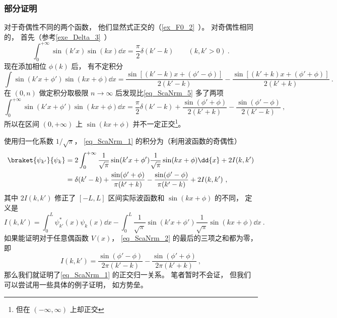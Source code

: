 \subsubsection{部分证明}
对于奇偶性不同的两个函数， 他们显然式正交的（\autoref{ex_F0_2}~）。 对奇偶性相同的， 首先（参考\autoref{exe_Delta_3}~）
\begin{equation}\label{eq_ScaNrm_5}
\int_{0}^{+\infty} \sin(k'x)\sin(kx)\dd{x} = \frac{\pi}{2}\delta(k'-k)
\qquad (k, k' > 0)~.
\end{equation}
现在添加相位 $\phi(k)$ 后， 有不定积分
\begin{equation}
\int \sin(k'x+\phi')\sin(kx+\phi) \dd{x} = \frac{\sin[(k'-k)x + (\phi'-\phi)]}{2(k'-k)}
- \frac{\sin[(k'+k)x+(\phi'+\phi)]}{2(k'+k)}~.
\end{equation}
在 $(0,n)$ 做定积分取极限 $n\to\infty$ 后发现比\autoref{eq_ScaNrm_5} 多了两项
\begin{equation}
\int_{0}^{+\infty} \sin(k'x+\phi')\sin(kx+\phi) \dd{x} = \frac{\pi}{2}\delta(k'-k)
+ \frac{\sin(\phi'+\phi)}{2(k'+k)} - \frac{\sin(\phi'-\phi)}{2(k'-k)}~,
\end{equation}
所以在区间 $(0, +\infty)$ 上 $\sin(kx+\phi)$ 并不一定正交\footnote{但在 $(-\infty,\infty)$ 上却正交}。

使用归一化系数 $1/\sqrt{\pi}$， \autoref{eq_ScaNrm_1} 的积分为（利用波函数的奇偶性）
\begin{equation}\label{eq_ScaNrm_2}
\begin{aligned}
\braket{\psi_{k'}}{\psi_k} &= 2\int_{0}^{+\infty} \frac{1}{\sqrt{\pi}}\sin(k'x+\phi')\frac{1}{\sqrt{\pi}}\sin(kx+\phi) \dd{x} + 2I(k,k')\\
&= \delta(k'-k) + \frac{\sin(\phi'+\phi)}{\pi(k'+k)} - \frac{\sin(\phi'-\phi)}{\pi(k'-k)} + 2I(k,k')~,
\end{aligned}
\end{equation}
其中 $2I(k,k')$ 修正了 $[-L,L]$ 区间实际波函数和 $\sin(kx+\phi)$ 的不同， 定义是
\begin{equation}\label{eq_ScaNrm_8}
I(k,k') = \int_0^L \psi_{k'}^*(x) \psi_k(x) \dd{x}
-\int_{0}^{L} \frac{1}{\sqrt{\pi}}\sin(k'x+\phi') \frac{1}{\sqrt{\pi}}\sin(kx+\phi) \dd{x}~.
\end{equation}
如果能证明对于任意偶函数 $V(x)$， \autoref{eq_ScaNrm_2} 的最后的三项之和都为零， 即
\begin{equation}
I(k,k') = \frac{\sin(\phi'-\phi)}{2\pi(k'-k)} - \frac{\sin(\phi'+\phi)}{2\pi(k'+k)}~,
\end{equation}
那么我们就证明了\autoref{eq_ScaNrm_1} 的正交归一关系。 笔者暂时不会证， 但我们可以尝试用一些具体的例子证明， 如方势垒。

